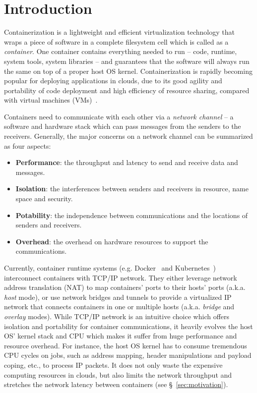 \section{Introduction} \label{sec:introduction}


Containerization is a lightweight and efficient virtualization technology that wraps a piece of software in a complete filesystem cell which is called as a {\em container}. One container 
contains everything needed to run -- code, runtime, system tools, system libraries -- and guarantees that the software will always run the same on top of a proper host OS kernel. Containerization is rapidly
becoming popular for deploying applications in clouds, due to its good agility and portability of code deployment and high efficiency of resource sharing, compared with virtual machines (VMs)~\cite{?}.

Containers need to communicate with each other via a {\em network channel} -- a software and hardware stack which can pass messages
from the senders to the receivers. 
Generally, the major concerns on a network channel can be summarized as four aspects:
\begin{itemize}
	\item{\textbf{Performance}}: the throughput and latency to send and receive data and messages.
	\item{\textbf{Isolation}}: the interferences between senders and receivers in resource, name space and security. 
	\item{\textbf{Potability}}: the independence between communications and the locations of senders and receivers.
	\item{\textbf{Overhead}}: the overhead on hardware resources to support the communications.
\end{itemize}
Currently, container runtime systems (e.g. Docker~\cite{?} and Kubernetes~\cite{?}) interconnect containers with TCP/IP network. 
They either leverage
network address translation (NAT) to map containers' ports to their hosts' ports (a.k.a. {\em host} mode), or use network bridges
and tunnels to provide a virtualized IP network that connects containers in one or multiple hosts (a.k.a. {\em bridge} and 
{\em overlay} modes). While TCP/IP network is an intuitive choice which offers isolation and portability for container communications, 
it heavily evolves the host OS' kernel stack and CPU which makes it suffer from huge performance and resource overhead.
For instance, the host OS kernel has to consume tremendous CPU cycles on jobs, such as address mapping, header manipulations and payload coping, etc., to process IP packets. It does not only waste the expensive computing resources in clouds, but also 
limits the network throughput and stretches the network latency between containers (see \S~\ref{sec:motivation}).

